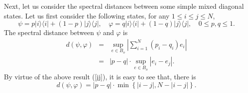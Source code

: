 \documentclass[a4paper,11pt]{article}
\begin{document}
Next, let us consider the spectral distances between some simple mixed diagonal states.
Let us first consider the following states, for any $1 \leqslant i \leqslant j \leqslant N$,
\begin{equation}
	\psi =  p|i \rangle \langle i|+(1-p)|j\rangle \langle j|, \quad \varphi = q|i \rangle \langle i|+(1-q)|j\rangle \langle j|, \quad 0 \leqslant p, q \leqslant 1.
\end{equation}
The spectral distance between $\psi$ and $\varphi$ is
\begin{eqnarray}
	d (\psi, \varphi) & = & \sup_{e \in B_o} \left| \sum_{i = 1}^N (p_i - q_i)
	e_i \right| \nonumber\\
	& = & |p - q|\cdot \sup_{e \in B_o} |e_i - e_j| .
\end{eqnarray}
By virtue of the above result (\ref{ij}), it is easy to see that, there is
\begin{equation}
	d (\psi, \varphi) = | p - q | \cdot \min \left\{ |i - j|, N - |i - j| \right\}.
\end{equation}
\end{document}
